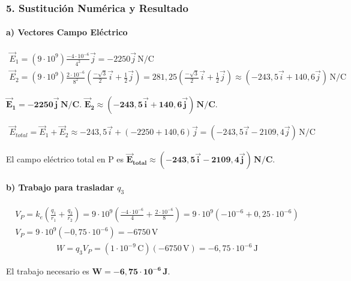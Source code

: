 \subsubsection*{5. Sustitución Numérica y Resultado}
\paragraph{a) Vectores Campo Eléctrico}
\begin{gather}
    \vec{E}_1 = (9\cdot10^9) \frac{-4\cdot10^{-6}}{4^2}\vec{j} = -2250 \vec{j} \, \text{N/C} \\
    \vec{E}_2 = (9\cdot10^9) \frac{2\cdot10^{-6}}{8^2} \left( \frac{-\sqrt{3}}{2}\vec{i} + \frac{1}{2}\vec{j} \right) = 281,25 \left( \frac{-\sqrt{3}}{2}\vec{i} + \frac{1}{2}\vec{j} \right) \approx (-243,5\vec{i} + 140,6\vec{j}) \, \text{N/C}
\end{gather}
\begin{cajaresultado}
$\boldsymbol{\vec{E}_1 = -2250 \vec{j} \, \textbf{N/C}}$.
$\boldsymbol{\vec{E}_2 \approx (-243,5\vec{i} + 140,6\vec{j}) \, \textbf{N/C}}$.
\end{cajaresultado}
\begin{gather}
    \vec{E}_{total} = \vec{E}_1+\vec{E}_2 \approx -243,5\vec{i} + (-2250+140,6)\vec{j} = (-243,5\vec{i} - 2109,4\vec{j}) \, \text{N/C}
\end{gather}
\begin{cajaresultado}
El campo eléctrico total en P es $\boldsymbol{\vec{E}_{total} \approx (-243,5\vec{i} - 2109,4\vec{j}) \, \textbf{N/C}}$.
\end{cajaresultado}

\paragraph{b) Trabajo para trasladar $q_3$}
\begin{gather}
    V_P = k_e\left(\frac{q_1}{r_1} + \frac{q_2}{r_2}\right) = 9\cdot10^9 \left( \frac{-4\cdot10^{-6}}{4} + \frac{2\cdot10^{-6}}{8} \right) = 9\cdot10^9 (-10^{-6} + 0,25\cdot10^{-6}) \\
    V_P = 9\cdot10^9 (-0,75\cdot10^{-6}) = -6750 \, \text{V}
\end{gather}
\begin{gather}
    W = q_3 V_P = (1\cdot10^{-9} \, \text{C})(-6750 \, \text{V}) = -6,75 \cdot 10^{-6} \, \text{J}
\end{gather}
\begin{cajaresultado}
El trabajo necesario es $\boldsymbol{W = -6,75 \cdot 10^{-6} \, \textbf{J}}$.
\end{cajaresultado}

